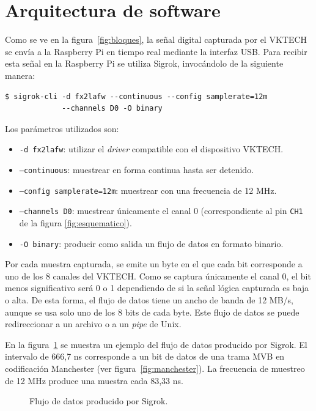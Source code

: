 \section{Arquitectura de software}
\label{sec:software}

Como se ve en la figura~\ref{fig:bloques}, la señal digital capturada por el VKTECH se envía a la Raspberry Pi en tiempo real mediante la interfaz USB. Para recibir esta señal en la Raspberry Pi se utiliza Sigrok, invocándolo de la siguiente manera:

\begin{lstlisting}
$ sigrok-cli -d fx2lafw --continuous --config samplerate=12m
             --channels D0 -O binary
\end{lstlisting}

Los parámetros utilizados son:

\begin{itemize}
    \item \texttt{-d fx2lafw}: utilizar el \textit{driver} compatible con el dispositivo VKTECH.
    \item \texttt{--continuous}: muestrear en forma continua hasta ser detenido.
    \item \texttt{--config samplerate=12m}: muestrear con una frecuencia de 12 MHz.
    \item \texttt{--channels D0}: muestrear únicamente el canal 0 (correspondiente al pin \texttt{CH1} de la figura \ref{fig:esquematico}).
    \item \texttt{-O binary}: producir como salida un flujo de datos en formato binario.
\end{itemize}

Por cada muestra capturada, se emite un byte en el que cada bit corresponde a uno de los 8 canales del VKTECH.
Como se captura únicamente el canal 0, el bit menos significativo será 0 o 1 dependiendo de si la señal lógica capturada es baja o alta.
De esta forma, el flujo de datos tiene un ancho de banda de 12 MB/s, aunque se usa solo uno de los 8 bits de cada byte.
Este flujo de datos se puede redireccionar a un archivo o a un \textit{pipe} de Unix.

En la figura~\ref{fig:sigrok} se muestra un ejemplo del flujo de datos producido por Sigrok. El intervalo de 666,7 ns corresponde a un bit de datos de una trama MVB en codificación Manchester (ver figura~\ref{fig:manchester}). La frecuencia de muestreo de 12 MHz produce una muestra cada 83,33 ns.

\begin{figure}[htbp]
	\centering
    {
        \fontsize{9pt}{9pt}\selectfont
        
    }
	\caption{Flujo de datos producido por Sigrok.}
    \label{fig:sigrok}
\end{figure}

